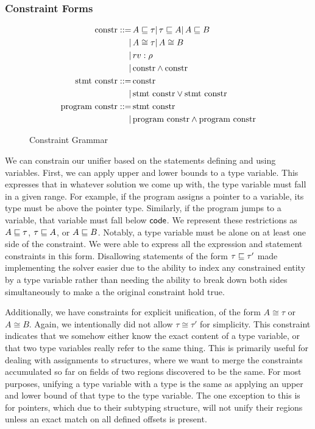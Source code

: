 \subsubsection{Constraint Forms}
\newcommand{\constr}{\textrm{constr}}
\newcommand{\sconstr}{\textrm{stmt constr}}
\newcommand{\pconstr}{\textrm{program constr}}
\newcommand{\unify}{\cong}
\begin{figure}[t]
\begin{align*}
\constr ::=&\, A \subt \tau
          |\, \tau \subt A
          |\, A \subt B\\
          |&\, A \unify \tau |\, A \unify B\\
          |&\, rv : \rho\\
          |&\, \constr \wedge \constr\\
\sconstr ::=&\, \constr\\
          |&\, \sconstr \vee \sconstr\\
\pconstr ::=&\, \sconstr\\
          |&\, \pconstr \wedge \pconstr\\
\end{align*}
\caption{Constraint Grammar}
\label{fig:cform}
\end{figure}

We can constrain our unifier based on the statements defining and using variables. First, we can apply upper and lower bounds to a type variable. This expresses that in whatever solution we come up with, the type variable must fall in a given range. For example, if the program assigns a pointer to a variable, its type must be above the pointer type. Similarly, if the program jumps to a variable, that variable must fall below $\mathsf{code}$.
We represent these restrictions as $A \sqsubseteq \tau$, $\tau \sqsubseteq A$, or $A \sqsubseteq B$.
Notably, a type variable must be alone on at least one side of the constraint. We were able to express all the expression and statement constraints in this form.
Disallowing statements of the form $\tau \sqsubseteq \tau'$ made implementing the solver easier due to the ability to index any constrained entity by a type variable rather than needing the ability to break down both sides simultaneously to make a the original constraint hold true.

Additionally, we have constraints for explicit unification, of the form $A \unify \tau$ or $A \unify B$. Again, we intentionally did not allow $\tau \unify \tau'$ for simplicity. This constraint indicates that we somehow either know the exact content of a type variable, or that two type variables really refer to the same thing. This is primarily useful for dealing with assignments to structures, where we want to merge the constraints accumulated so far on fields of two regions discovered to be the same. For most purposes, unifying a type variable with a type is the same as applying an upper and lower bound of that type to the type variable. The one exception to this is for pointers, which due to their subtyping structure, will not unify their regions unless an exact match on all defined offsets is present.

